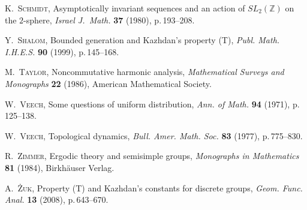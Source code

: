 \documentclass[11pt,english,a4paper]{smfart}
\numberwithin{equation}{section}
\theoremstyle{definition}
\begin{document}
\begin{thebibliography}{99999}
{
\textsc{K.~Schmidt,}
\newblock Asymptotically invariant sequences and an action of $SL_{2}({\ensuremath{\mathbb Z}})$ on the $2$-sphere,
\newblock \emph{Israel J.~Math.}  \textbf{37} (1980), p.\,193--208.

 \textsc{Y.~Shalom,}
\newblock Bounded generation and {Kazhdan}'s property (T),
\newblock \emph{Publ. Math. I.H.E.S.}  {\bf 90} (1999), p.\,145--168.

\textsc{M.~Taylor,}
\newblock Noncommutative harmonic analysis,
\newblock \emph{Mathematical Surveys and Monographs} \textbf{22} (1986), American Mathematical Society.

\textsc{W.~Veech,}
\newblock Some questions of uniform distribution,
\newblock \emph{Ann. of Math.}  \textbf{94} (1971), p.\,125--138. 

\textsc{W.~Veech,} 
\newblock Topological dynamics, 
\newblock \emph{Bull. Amer. Math. Soc.} \textbf{83} (1977), p.\,775--830. 

\textsc{R.~Zimmer,}
\newblock Ergodic theory and semisimple groups, 
\newblock \emph{Monographs in Mathematics} \textbf{81} (1984), Birkh\"auser Verlag.

 \textsc{A.~\.Zuk,}
\newblock Property (T) and {Kazhdan}'s constants for discrete groups,
\newblock \emph{Geom. Func. Anal.}  {\bf 13} (2008), p.\,643--670.

}
 \end{thebibliography}
\end{document}
